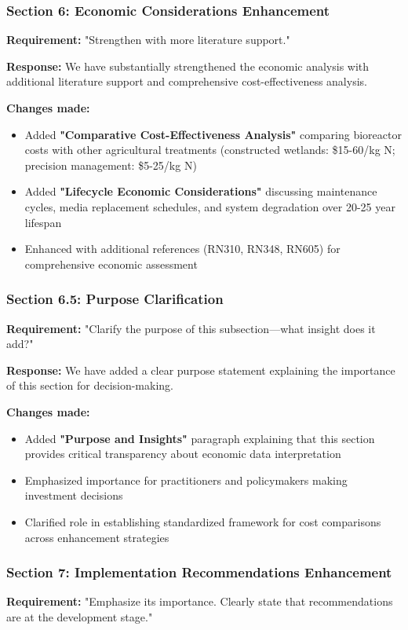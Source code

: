 \documentclass[12pt,a4paper]{article}
\begin{document}
\subsubsection{Section 6: Economic Considerations Enhancement}
\textbf{Requirement:} "Strengthen with more literature support."

\textbf{Response:} We have substantially strengthened the economic analysis with additional literature support and comprehensive cost-effectiveness analysis.

\textbf{Changes made:}
\begin{itemize}
\item Added \textbf{"Comparative Cost-Effectiveness Analysis"} comparing bioreactor costs with other agricultural treatments (constructed wetlands: \$15-60/kg N; precision management: \$5-25/kg N)
\item Added \textbf{"Lifecycle Economic Considerations"} discussing maintenance cycles, media replacement schedules, and system degradation over 20-25 year lifespan
\item Enhanced with additional references (RN310, RN348, RN605) for comprehensive economic assessment
\end{itemize}

\subsubsection{Section 6.5: Purpose Clarification}
\textbf{Requirement:} "Clarify the purpose of this subsection—what insight does it add?"

\textbf{Response:} We have added a clear purpose statement explaining the importance of this section for decision-making.

\textbf{Changes made:}
\begin{itemize}
\item Added \textbf{"Purpose and Insights"} paragraph explaining that this section provides critical transparency about economic data interpretation
\item Emphasized importance for practitioners and policymakers making investment decisions
\item Clarified role in establishing standardized framework for cost comparisons across enhancement strategies
\end{itemize}

\subsubsection{Section 7: Implementation Recommendations Enhancement}
\textbf{Requirement:} "Emphasize its importance. Clearly state that recommendations are at the development stage."
\end{document}
